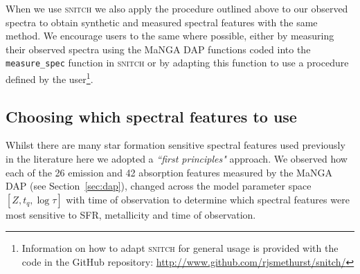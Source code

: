 \documentclass[useAMS,usenatbib]{mn2e}
\begin{document}
When we use \textsc{snitch} we also apply the procedure outlined above to our observed spectra to obtain synthetic and measured spectral features with the same method. We encourage users to the same where possible, either by measuring their observed spectra using the MaNGA DAP functions coded into the \texttt{measure\_spec} function in \textsc{snitch} or by adapting this function to use a procedure defined by the user\footnote{Information on how to adapt \textsc{snitch} for general usage is provided with the code in the GitHub repository: \url{http://www.github.com/rjsmethurst/snitch/}}.

\subsection{Choosing which spectral features to use}\label{sec:choosespf}

Whilst there are many star formation sensitive spectral features used previously in the literature \citep[see comprehensive review by][]{kennevans12} here we adopted a \emph{``first principles"} approach. We observed how each of the 26 emission and 42 absorption features measured by the MaNGA DAP (see Section~\ref{sec:dap}), changed across the model parameter space $[Z, t_q, \log \tau]$ with time of observation to determine which spectral features were most sensitive to SFR, metallicity and time of observation. 
\end{document}
